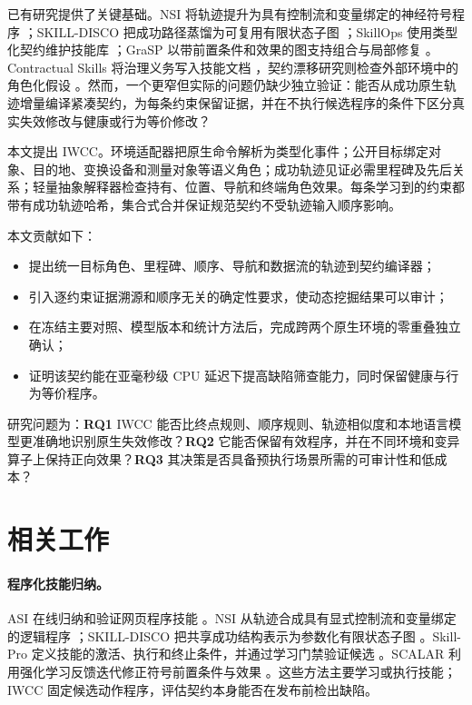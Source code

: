 \documentclass[10pt]{article}
\begin{document}
已有研究提供了关键基础。NSI 将轨迹提升为具有控制流和变量绑定的神经符号程序 \citep{shao2026nsi}；SKILL-DISCO 把成功路径蒸馏为可复用有限状态子图 \citep{guo2026skilldisco}；SkillOps 使用类型化契约维护技能库 \citep{pu2026skillops}；GraSP 以带前置条件和效果的图支持组合与局部修复 \citep{xia2026grasp}。Contractual Skills 将治理义务写入技能文档 \citep{liu2026contractual}，契约漂移研究则检查外部环境中的角色化假设 \citep{fan2026drift}。然而，一个更窄但实际的问题仍缺少独立验证：能否从成功原生轨迹增量编译紧凑契约，为每条约束保留证据，并在不执行候选程序的条件下区分真实失效修改与健康或行为等价修改？

本文提出 IWCC。环境适配器把原生命令解析为类型化事件；公开目标绑定对象、目的地、变换设备和测量对象等语义角色；成功轨迹见证必需里程碑及先后关系；轻量抽象解释器检查持有、位置、导航和终端角色效果。每条学习到的约束都带有成功轨迹哈希，集合式合并保证规范契约不受轨迹输入顺序影响。

本文贡献如下：
\begin{itemize}
  \item 提出统一目标角色、里程碑、顺序、导航和数据流的轨迹到契约编译器；
  \item 引入逐约束证据溯源和顺序无关的确定性要求，使动态挖掘结果可以审计；
  \item 在冻结主要对照、模型版本和统计方法后，完成跨两个原生环境的零重叠独立确认；
  \item 证明该契约能在亚毫秒级 CPU 延迟下提高缺陷筛查能力，同时保留健康与行为等价程序。
\end{itemize}

研究问题为：\textbf{RQ1} IWCC 能否比终点规则、顺序规则、轨迹相似度和本地语言模型更准确地识别原生失效修改？\textbf{RQ2} 它能否保留有效程序，并在不同环境和变异算子上保持正向效果？\textbf{RQ3} 其决策是否具备预执行场景所需的可审计性和低成本？

\section{相关工作}
\paragraph{程序化技能归纳。}
ASI 在线归纳和验证网页程序技能 \citep{wang2025asi}。NSI 从轨迹合成具有显式控制流和变量绑定的逻辑程序 \citep{shao2026nsi}；SKILL-DISCO 把共享成功结构表示为参数化有限状态子图 \citep{guo2026skilldisco}。Skill-Pro 定义技能的激活、执行和终止条件，并通过学习门禁验证候选 \citep{mi2026skillpro}。SCALAR 利用强化学习反馈迭代修正符号前置条件与效果 \citep{zabounidis2026scalar}。这些方法主要学习或执行技能；IWCC 固定候选动作程序，评估契约本身能否在发布前检出缺陷。
\end{document}
